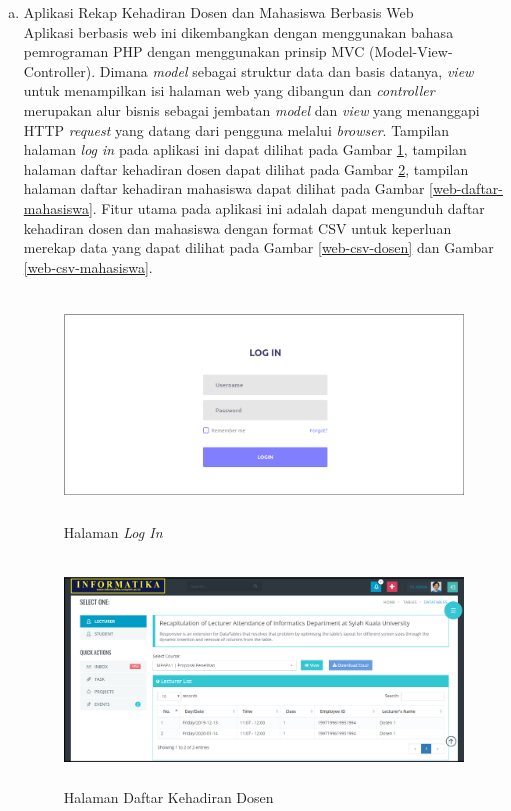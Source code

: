 \begin{enumerate}[a.]
	\item Aplikasi Rekap Kehadiran Dosen dan Mahasiswa Berbasis Web
	      \\
	      Aplikasi berbasis web ini dikembangkan dengan menggunakan bahasa pemrograman PHP dengan menggunakan prinsip MVC (Model-View-Controller). Dimana \textit{model} sebagai struktur data dan basis datanya, \textit{view} untuk menampilkan isi halaman web yang dibangun dan \textit{controller} merupakan alur bisnis sebagai jembatan \textit{model} dan \textit{view} yang menanggapi HTTP \textit{request} yang datang dari pengguna melalui \textit{browser}. Tampilan halaman \textit{log in} pada aplikasi ini dapat dilihat pada Gambar \ref{web-login}, tampilan halaman daftar kehadiran dosen dapat dilihat pada Gambar \ref{web-daftar-dosen}, tampilan halaman daftar kehadiran mahasiswa dapat dilihat pada Gambar \ref{web-daftar-mahasiswa}. Fitur utama pada aplikasi ini adalah dapat mengunduh daftar kehadiran dosen dan mahasiswa dengan format CSV untuk keperluan merekap data yang dapat dilihat pada Gambar \ref{web-csv-dosen} dan Gambar \ref{web-csv-mahasiswa}.
	      \vspace{-0.2cm}
	      \begin{figure}[H]
		      \center
		      \includegraphics [width = 13cm, height= 6cm]{gambar/web/login}
		      \caption{Halaman \textit{Log In}}
		      \label{web-login}
	      \end{figure}

	      \vspace{-0.2cm}
	      \begin{figure}[H]
		      \center
		      \includegraphics [width = 13cm, height= 6cm]{gambar/web/dashboard-dosen}
		      \caption{Halaman Daftar Kehadiran Dosen}
		      \label{web-daftar-dosen}
	      \end{figure}


\end{enumerate}
